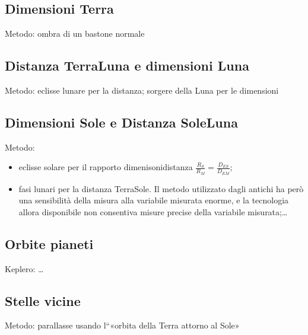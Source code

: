 \documentclass[letterpaper,10pt,italian]{jupyterBook}
\begin{document}
\subsection{Dimensioni Terra}
\label{\detokenize{ch/modern/astronomy-distance-ladder:dimensioni-terra}}
\sphinxAtStartPar
Metodo: ombra di un bastone normale


\subsection{Distanza Terra\sphinxhyphen{}Luna e dimensioni Luna}
\label{\detokenize{ch/modern/astronomy-distance-ladder:distanza-terra-luna-e-dimensioni-luna}}
\sphinxAtStartPar
Metodo: eclisse lunare per la distanza; sorgere della Luna per le dimensioni


\subsection{Dimensioni Sole e Distanza Sole\sphinxhyphen{}Luna}
\label{\detokenize{ch/modern/astronomy-distance-ladder:dimensioni-sole-e-distanza-sole-luna}}
\sphinxAtStartPar
Metodo:
\begin{itemize}
\item {} 
\sphinxAtStartPar
eclisse solare per il rapporto dimenisoni\sphinxhyphen{}distanza \(\frac{R_S}{R_M} = \frac{D_{ES}}{D_{EM}}\);

\item {} 
\sphinxAtStartPar
fasi lunari per la distanza Terra\sphinxhyphen{}Sole. Il metodo utilizzato dagli antichi ha però una sensibilità della misura alla variabile misurata enorme, e la tecnologia allora disponibile non consentiva misure precise della variabile misurata;…

\end{itemize}


\subsection{Orbite pianeti}
\label{\detokenize{ch/modern/astronomy-distance-ladder:orbite-pianeti}}
\sphinxAtStartPar
Keplero: …


\subsection{Stelle vicine}
\label{\detokenize{ch/modern/astronomy-distance-ladder:stelle-vicine}}
\sphinxAtStartPar
Metodo: parallasse usando l“«orbita della Terra attorno al Sole»
\end{document}
